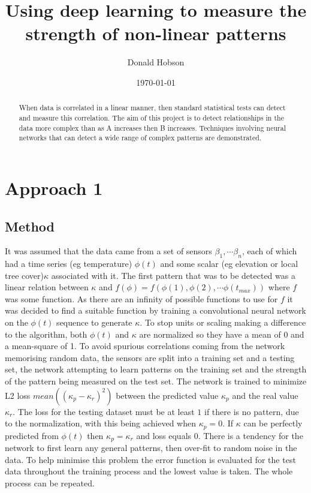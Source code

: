 \documentclass[12pt]{article}
\begin{document}
\title{Using deep learning to measure the strength of non-linear patterns}
\author{Donald Hobson}
\date{\today}
\maketitle
\begin{abstract}
When data is correlated in a linear manner, then standard statistical tests can detect and measure this correlation. The aim of this project is to detect relationships in the data more complex than as A increases then B increases. Techniques involving neural networks that can detect a wide range of complex patterns are demonstrated. 
\end{abstract}


\section{Approach 1}
\subsection{Method}
It was assumed that the data came from a set of sensors $\beta_1,\cdots\beta_n$, each of which had a time series (eg temperature) $\phi(t)$ and some scalar (eg elevation or local tree cover)$\kappa$ associated with it. The first pattern that was to be detected was a linear relation between $\kappa$ and $f(\phi) = f(\phi(1),\phi(2),\cdots\phi(t_{max}))$ where $f$ was some function. As there are an infinity of possible functions to use for $f$ it was decided to find a suitable function by training a convolutional neural network on the $\phi(t)$ sequence to generate $\kappa$. To stop units or scaling making a difference to the algorithm, both $\phi(t)$ and $\kappa$ are normalized so they have a mean of 0 and a mean-square of 1. To avoid spurious correlations coming from the network memorising random data, the sensors are split into a training set and a testing set, the network attempting to learn patterns on the training set and the strength of the pattern being measured on the test set. 
The network is trained to minimize L2 loss $mean((\kappa_p-\kappa_r)^2)$ between the predicted value $\kappa_p$ and the real value $\kappa_r$. The loss for the testing dataset must be at least $1$ if there is no pattern, due to the normalization, with this being achieved when $\kappa_p = 0$. If $\kappa$ can be perfectly predicted from $\phi(t)$ then $\kappa_p = \kappa_r$ and loss equals $0$. There is a tendency for the network to first learn any general patterns, then over-fit to random noise in the data. To help minimise this problem the error function is evaluated for the test data throughout the training process and the lowest value is taken. The whole process can be repeated.
\end{document}
